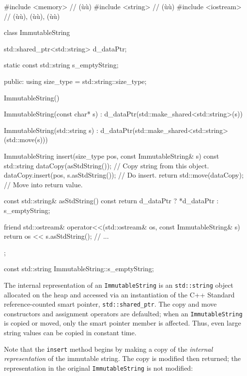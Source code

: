 \begin{emcppslisting}[emcppsbatch=e6]
#include <memory>    // (ù{}ù)
#include <string>    // (ù{}ù)
#include <iostream>  // (ù{}ù), (ù{}ù), (ù{}ù)

class ImmutableString
{
    std::shared_ptr<std::string> d_dataPtr;

    static const std::string s_emptyString;

public:
    using size_type = std::string::size_type;

    ImmutableString() {}

    ImmutableString(const char* s)
        : d_dataPtr(std::make_shared<std::string>(s)) { }

    ImmutableString(std::string s)
        : d_dataPtr(std::make_shared<std::string>(std::move(s))) { }

    ImmutableString insert(size_type pos, const ImmutableString& s) const
    {
        std::string dataCopy(asStdString());    // Copy string from this object.
        dataCopy.insert(pos, s.asStdString());  // Do insert.
        return std::move(dataCopy);             // Move into return value.
    }

    const std::string& asStdString() const
    {
        return d_dataPtr ? *d_dataPtr : s_emptyString;
    }

    friend std::ostream& operator<<(std::ostream& os, const ImmutableString& s)
    {
        return os << s.asStdString();
    }
    // ...
};

const std::string ImmutableString::s_emptyString{};
\end{emcppslisting}
    

\noindent The internal representation of an \lstinline!ImmutableString! is an
\lstinline!std::string! object allocated on the heap and accessed via an
instantiation of the C++ Standard reference-counted smart pointer,
\lstinline!std::shared_ptr!. The copy and move constructors and assignment
operators are defaulted; when an \lstinline!ImmutableString! is copied or
moved, only the smart pointer member is affected. Thus, even large
string values can be copied in constant time.

Note that the \lstinline!insert! method begins by making a copy of the
\emph{internal representation} of the immutable string. The copy is
modified then returned; the representation in the original
\lstinline!ImmutableString! is not modified:

